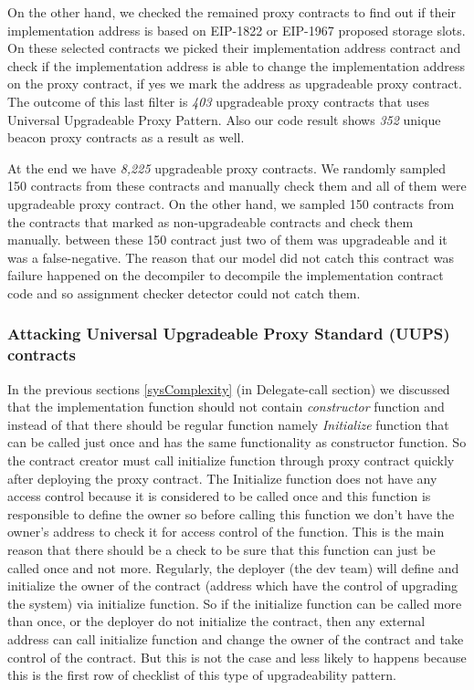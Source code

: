On the other hand, we checked the remained proxy contracts to find out if their implementation address is based on EIP-1822 or EIP-1967 proposed storage slots. On these selected contracts we picked their implementation address contract and check if the implementation address is able to change the implementation address on the proxy contract, if yes we mark the address as upgradeable proxy contract. The outcome of this last filter is \textit{403} upgradeable proxy contracts that uses Universal Upgradeable Proxy Pattern. Also our code result shows \textit{352} unique beacon proxy contracts as a result as well.

At the end we have \textit{8,225} upgradeable proxy contracts. We randomly sampled 150 contracts from these contracts and manually check them and all of them were upgradeable proxy contract. On the other hand, we sampled 150 contracts from the contracts that marked as non-upgradeable contracts and check them manually. between these 150 contract just two of them was upgradeable and it was a false-negative. The reason that our model did not catch this contract was failure happened on the decompiler to decompile the implementation contract code and so assignment checker detector could not catch them. 

\subsubsection{Attacking Universal Upgradeable Proxy Standard (UUPS) contracts}
In the previous sections \ref{sysComplexity} (in Delegate-call section) we discussed that the implementation function should not contain \textit{constructor} function and instead of that there should be regular function namely \textit{Initialize} function that can be called just once and has the same functionality as constructor function. So the contract creator must call initialize function through proxy contract quickly after deploying the proxy contract. The Initialize function does not have any access control because it is considered to be called once and this function is responsible to define the owner so before calling this function we don't have the owner's address to check it for access control of the function. This is the main reason that there should be a check to be sure that this function can just be called once and not more. Regularly, the deployer (the dev team) will define and initialize the owner of the contract (address which have the control of upgrading the system) via initialize function. So if the initialize function can be called more than once, or the deployer do not initialize the contract, then any external address can call initialize function and change the owner of the contract and take control of the contract. But this is not the case and less likely to happens because this is the first row of checklist of this type of upgradeability pattern.

